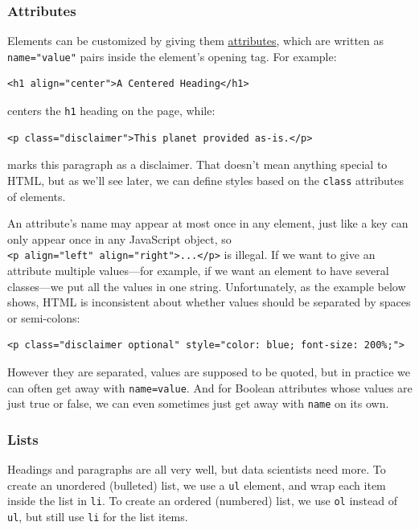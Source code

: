 \subsubsection{Attributes}\label{s:htmlcss-attributes}

Elements can be customized by giving them
\protect\hyperlink{g:attribute}{attributes}, which are written as
\texttt{name="value"} pairs inside the element's opening tag. For
example:

\begin{verbatim}
<h1 align="center">A Centered Heading</h1>
\end{verbatim}

centers the \texttt{h1} heading on the page, while:

\begin{verbatim}
<p class="disclaimer">This planet provided as-is.</p>
\end{verbatim}

marks this paragraph as a disclaimer. That doesn't mean anything special
to HTML, but as we'll see later, we can define styles based on the
\texttt{class} attributes of elements.

An attribute's name may appear at most once in any element, just like a
key can only appear once in any JavaScript object, so
\texttt{\textless{}p\ align="left"\ align="right"\textgreater{}...\textless{}/p\textgreater{}}
is illegal. If we want to give an attribute multiple values---for
example, if we want an element to have several classes---we put all the
values in one string. Unfortunately, as the example below shows, HTML is
inconsistent about whether values should be separated by spaces or
semi-colons:

\begin{verbatim}
<p class="disclaimer optional" style="color: blue; font-size: 200%;">
\end{verbatim}

However they are separated, values are supposed to be quoted, but in
practice we can often get away with \texttt{name=value}. And for Boolean
attributes whose values are just true or false, we can even sometimes
just get away with \texttt{name} on its own.

\subsubsection{Lists}\label{s:htmlcss-lists}

Headings and paragraphs are all very well, but data scientists need
more. To create an unordered (bulleted) list, we use a \texttt{ul}
element, and wrap each item inside the list in \texttt{li}. To create an
ordered (numbered) list, we use \texttt{ol} instead of \texttt{ul}, but
still use \texttt{li} for the list items.

